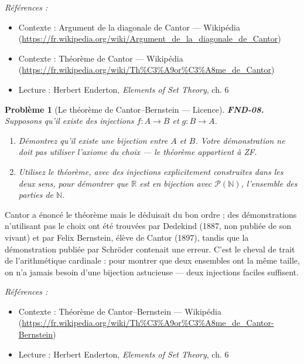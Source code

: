 \documentclass[11pt]{article}
\newtheorem{problem}{Problème}
\newenvironment{refs}{\par\small\noindent\emph{Références :}\begin{itemize}\setlength\itemsep{0pt}}{\end{itemize}\normalsize}
\begin{document}
\begin{refs}
\item Contexte : Argument de la diagonale de Cantor --- Wikipédia (\url{https://fr.wikipedia.org/wiki/Argument_de_la_diagonale_de_Cantor})
\item Contexte : Théorème de Cantor --- Wikipédia (\url{https://fr.wikipedia.org/wiki/Th%C3%A9or%C3%A8me_de_Cantor})
\item Lecture : Herbert Enderton, \textit{Elements of Set Theory}, ch. 6
\end{refs}

\bigskip

\begin{problem}[{Le théorème de Cantor--Bernstein --- Licence}]
\textbf{FND-08.} Supposons qu'il existe des injections $ f\colon A \to B $ et
$ g\colon B \to A $.
\begin{enumerate}
\item[(a)] Démontrez qu'il existe une bijection entre $ A $ et $ B $. Votre démonstration ne doit
pas utiliser l'axiome du choix --- le théorème appartient à ZF.
\item[(b)] Utilisez le théorème, avec des injections explicitement construites dans les deux sens, pour
démontrer que $ \mathbb{R} $ est en bijection avec $ \mathcal{P}(\mathbb{N}) $, l'ensemble
des parties de $ \mathbb{N} $.
\end{enumerate}

\end{problem}

\noindent Cantor a énoncé le théorème mais le déduisait du bon ordre ; des démonstrations
n'utilisant pas le choix ont été trouvées par Dedekind (1887, non publiée de son vivant) et par
Felix Bernstein, élève de Cantor (1897), tandis que la démonstration publiée par Schröder
contenait une erreur. C'est le cheval de trait de l'arithmétique cardinale : pour montrer que deux
ensembles ont la même taille, on n'a jamais besoin d'une bijection astucieuse --- deux injections
faciles suffisent.

\begin{refs}
\item Contexte : Théorème de Cantor--Bernstein --- Wikipédia (\url{https://fr.wikipedia.org/wiki/Th%C3%A9or%C3%A8me_de_Cantor-Bernstein})
\item Lecture : Herbert Enderton, \textit{Elements of Set Theory}, ch. 6
\end{refs}

\bigskip
\end{document}
